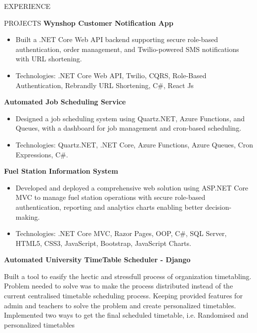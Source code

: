 \documentclass{resume} %
\begin{document}
\begin{rSection}{EXPERIENCE}
\begin{rSection}{PROJECTS}
 \textbf {Wynshop Customer Notification App} 
	\begin{itemize}
		\itemsep -5pt {} 
		\item Built a .NET Core Web API backend supporting secure role-based authentication, order management, and Twilio-powered SMS notifications with URL shortening.
		\item Technologies: .NET Core Web API, Twilio, CQRS, Role-Based Authentication, Rebrandly URL Shortening, C\#, React Js
	\end{itemize}
 \textbf {Automated Job Scheduling Service} 
	\begin{itemize}
		\itemsep -5pt {} 
		\item Designed a job scheduling system using Quartz.NET, Azure Functions, and Queues, with a dashboard for job management and cron-based scheduling.			
		\item Technologies: Quartz.NET, .NET Core, Azure Functions, Azure Queues, Cron Expressions, C\#.  
	\end{itemize}
 \textbf{Fuel Station Information System}
	
	\begin{itemize}
		\itemsep -3pt {} 
		\item Developed and deployed a comprehensive web solution using ASP.NET Core MVC to manage fuel station operations with secure role-based authentication, reporting and analytics charts enabling better decision-making.
		
		\item Technologies: .NET Core MVC, Razor Pages, OOP, C\#, SQL Server, HTML5, CSS3, JavaScript, Bootstrap, JavaScript Charts.
	\end{itemize}




\iffalse
\item \textbf{Automated University TimeTable Scheduler - Django}





 {Built a tool to easify the hectic and stressfull process of organization timetabling. Problem needed to solve was to make the process distributed instead of the current centralised timetable scheduling process. Keeping provided features for admin and teachers to solve the problem and create personalized timetables. Implemented two ways to get the final scheduled timetable, i.e. Randomised and personalized timetables}


\end{rSection}
\end{rSection}
\end{document}

